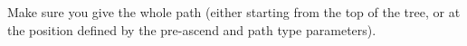 
Make sure you give the whole path (either starting from the top of the tree, or at the position defined by the pre-ascend and path type parameters).


